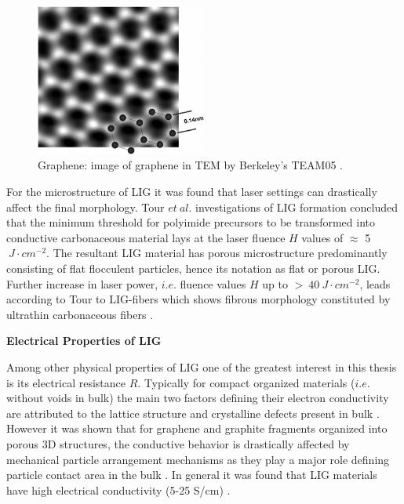 \begin{figure}[H]
\centering
\includegraphics[width=0.5\textwidth]{Figures/Theory/Real_graphene.jpg}
\medskip
\caption{Graphene: image of graphene in TEM by Berkeley’s TEAM05 \cite{Graphene}.}
\label{fig:real-graphene}
\end{figure}

For the microstructure of LIG it was found that laser settings can drastically affect the final morphology. Tour \textit{$et\ al.$} investigations of LIG formation concluded that the minimum threshold for polyimide precursors to be transformed into conductive carbonaceous material lays at the laser fluence $H$ values of $\approx$ 5$\ J\cdot cm^{-2}$. The resultant LIG material has porous microstructure predominantly consisting of flat flocculent particles, hence its notation as flat or porous LIG. Further increase in laser power, $i.e.$ fluence values $H$ up to $>\ 40\ J\cdot cm^{-2}$, leads according to Tour to LIG-fibers which shows fibrous morphology constituted by ultrathin carbonaceous fibers \cite{DUY2018472}. 


\textbf{Electrical Properties of LIG}

Among other physical properties of LIG one of the greatest interest in this thesis is its electrical resistance $R$. 
Typically for compact organized materials ($i.e.$ without voids in bulk) the main two factors defining their electron conductivity are attributed to the lattice structure and crystalline defects present in bulk \cite{gross2012festkoerperphysik}. However it was shown that for graphene and graphite fragments organized into porous 3D structures, the conductive behavior is drastically affected by mechanical particle arrangement mechanisms as they play a major role defining particle contact area in the bulk \cite{marinho_electrical_2012}. In general it was found that LIG materials have high electrical conductivity (5-25 S/cm) \cite{doi:10.1002/adma.201803621}. 

